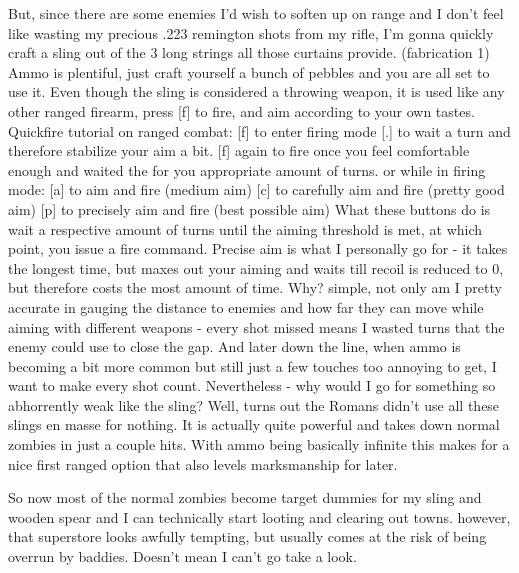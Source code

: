 \documentclass[11pt]{report}
\begin{document}
But, since there are some enemies I'd wish to soften up on range and I don't feel like wasting my precious .223 remington shots from my rifle, I'm gonna quickly craft a sling out of the 3 long strings all those curtains provide. (fabrication 1) Ammo is plentiful, just craft yourself a bunch of pebbles and you are all set to use it.
Even though the sling is considered a throwing weapon, it is used like any other ranged firearm, press [f] to fire, and aim according to your own tastes.
Quickfire tutorial on ranged combat:
[f] to enter firing mode
[.] to wait a turn and therefore stabilize your aim a bit.
[f] again to fire once you feel comfortable enough and waited the for you appropriate amount of turns.
or
while in firing mode:
[a] to aim and fire (medium aim)
[c] to carefully aim and fire (pretty good aim)
[p] to precisely aim and fire (best possible aim)
What these buttons do is wait a respective amount of turns until the aiming threshold is met, at which point, you issue a fire command.
Precise aim is what I personally go for - it takes the longest time, but maxes out your aiming and waits till recoil is reduced to 0, but therefore costs the most amount of time. Why? simple, not only am I pretty accurate in gauging the distance to enemies and how far they can move while aiming with different weapons - every shot missed means I wasted turns that the enemy could use to close the gap. And later down the line, when ammo is becoming a bit more common but still just a few touches too annoying to get, I want to make every shot count.
Nevertheless - why would I go for something so abhorrently weak like the sling? Well, turns out the Romans didn't use all these slings en masse for nothing. It is actually quite powerful and takes down normal zombies in just a couple hits. With ammo being basically infinite this makes for a nice first ranged option that also levels marksmanship for later.

So now most of the normal zombies become target dummies for my sling and wooden spear and I can technically start looting and clearing out towns. however, that superstore looks awfully tempting, but usually comes at the risk of being overrun by baddies. Doesn't mean I can't go take a look.
\end{document}
